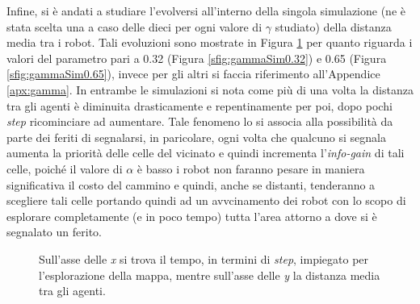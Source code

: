 Infine, si è andati a studiare l'evolversi all'interno della singola simulazione (ne è stata scelta una a caso delle dieci per ogni valore di $\gamma$ studiato) della distanza media tra i robot.
Tali evoluzioni sono mostrate in Figura \ref{fig:gammaSim} per quanto riguarda i valori del parametro pari a 0.32 (Figura \ref{sfig:gammaSim0.32}) e 0.65 (Figura \ref{sfig:gammaSim0.65}), invece per gli altri si faccia riferimento all'Appendice \ref{apx:gamma}.
In entrambe le simulazioni si nota come più di una volta la distanza tra gli agenti è diminuita drasticamente e repentinamente per poi, dopo pochi \textit{step} ricominciare ad aumentare.
Tale fenomeno lo si associa alla possibilità da parte dei feriti di segnalarsi, in paricolare, ogni volta che qualcuno si segnala aumenta la priorità delle celle del vicinato e quindi incrementa l'\textit{info-gain} di tali celle, poiché il valore di $\alpha$ è basso i robot non faranno pesare in maniera significativa il costo del cammino e quindi, anche se distanti, tenderanno a scegliere tali celle portando quindi ad un avvcinamento dei robot con lo scopo di esplorare completamente (e in poco tempo) tutta l'area attorno a dove si è segnalato un ferito.
\begin{figure}
	\hfill
	\caption{Sull'asse delle \textit{x} si trova il tempo, in termini di \textit{step}, impiegato per l'esplorazione della mappa, mentre sull'asse delle \textit{y} la distanza media tra gli agenti.}
	\label{fig:gammaSim}
\end{figure}

